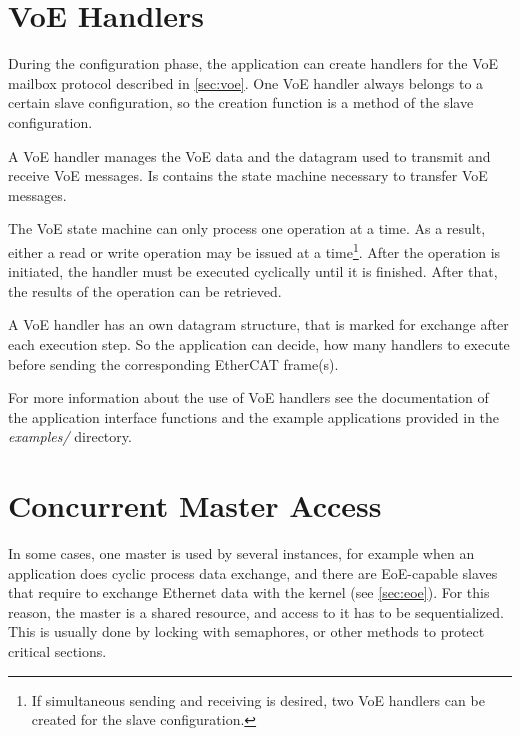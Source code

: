 \documentclass[a4paper,12pt,BCOR6mm,bibtotoc,idxtotoc]{scrbook}
\begin{document}
%


\section{VoE Handlers}
\label{sec:api-voe}

During the configuration phase, the application can create handlers for the
VoE mailbox protocol described in \autoref{sec:voe}. One VoE handler always
belongs to a certain slave configuration, so the creation function is a method
of the slave configuration.

A VoE handler manages the VoE data and the datagram used to transmit and
receive VoE messages. Is contains the state machine necessary to transfer VoE
messages.

The VoE state machine can only process one operation at a time. As a result,
either a read or write operation may be issued at a time\footnote{If
simultaneous sending and receiving is desired, two VoE handlers can be created
for the slave configuration.}. After the operation is initiated, the handler
must be executed cyclically until it is finished. After that, the results of
the operation can be retrieved.

A VoE handler has an own datagram structure, that is marked for exchange after
each execution step. So the application can decide, how many handlers to
execute before sending the corresponding EtherCAT frame(s).

For more information about the use of VoE handlers see the documentation of
the application interface functions and the example applications provided in
the \textit{examples/} directory.


\section{Concurrent Master Access}
\label{sec:concurr}

In some cases, one master is used by several instances, for example when an
application does cyclic process data exchange, and there are EoE-capable
slaves that require to exchange Ethernet data with the kernel (see
\autoref{sec:eoe}). For this reason, the master is a shared resource, and
access to it has to be sequentialized. This is usually done by locking with
semaphores, or other methods to protect critical sections.
\end{document}
